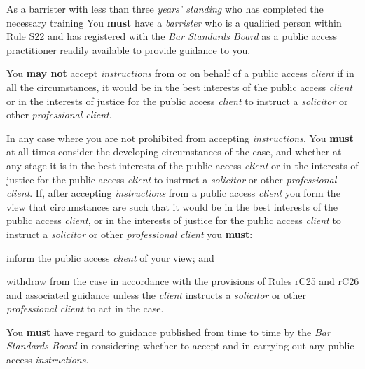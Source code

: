 As a barrister with less than three \emph{years' standing} who has
completed the necessary training You \textcolor{myred}{\textbf{must}} have a \emph{barrister} who is
a qualified person within Rule S22 and has registered with the \emph{Bar
Standards Board} as a public access practitioner readily available to
provide guidance to you.


You \textcolor{myred}{\textbf{may not}} accept \emph{instructions} from or on behalf of a public
access \emph{client} if in all the circumstances, it would be in the
best interests of the public access \emph{client} or in the interests of
justice for the public access \emph{client} to instruct a
\emph{solicitor} or other \emph{professional client}.


In any case where you are not prohibited from accepting
\emph{instructions}, You \textcolor{myred}{\textbf{must}} at all times consider the developing
circumstances of the case, and whether at any stage it is in the best
interests of the public access \emph{client} or in the interests of
justice for the public access \emph{client} to instruct a
\emph{solicitor} or other \emph{professional client}. If, after
accepting \emph{instructions} from a public access \emph{client} you
form the view that circumstances are such that it would be in the best
interests of the public access \emph{client}, or in the interests of
justice for the public access \emph{client} to instruct a
\emph{solicitor} or other \emph{professional client} you \textcolor{myred}{\textbf{must}}:
\begin{numlist}\item inform the public access \emph{client} of your view; and
\item withdraw from the case in accordance with the provisions of Rules
rC25 and rC26 and associated guidance unless the \emph{client} instructs
a \emph{solicitor} or other \emph{professional client} to act in the
case.
\end{numlist}

You \textcolor{myred}{\textbf{must}} have regard to guidance published from time to time by the
\emph{Bar Standards Board} in considering whether to accept and in
carrying out any public access \emph{instructions}.


